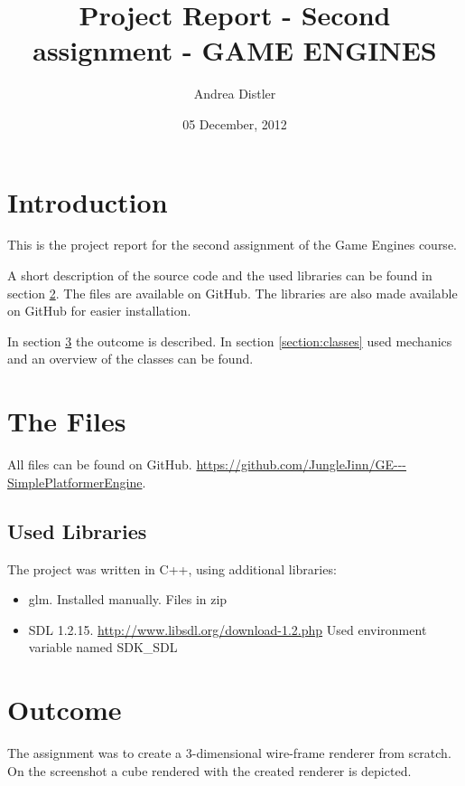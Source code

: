 \documentclass[12pt]{article}
\title{Project Report - Second assignment - GAME ENGINES}
\author{Andrea Distler}
\date{05 December, 2012}
\begin{document}
\maketitle
\newpage

\tableofcontents
\newpage

\section{Introduction}
This is the project report for the second assignment of the Game Engines course.

A short description of the source code and the used libraries can be found in section \ref{section:files}. The files are available on GitHub. The libraries are also made available on GitHub for easier installation.

In section \ref{section:outcome} the outcome is described. In section \ref{section:classes} used mechanics and an overview of the classes can be found.

\section{The Files}
\label{section:files}
All files can be found on GitHub. \newline 
\url{https://github.com/JungleJinn/GE---SimplePlatformerEngine}.

\subsection{Used Libraries}

The project was written in C++, using additional libraries:

\begin{itemize}
		\item{glm. Installed manually. Files in zip}
		\item{SDL 1.2.15. \url{http://www.libsdl.org/download-1.2.php} Used environment variable named SDK\_SDL}
\end{itemize}

\section{Outcome}
\label{section:outcome}

The assignment was to create a 3-dimensional wire-frame renderer from scratch. On the screenshot a cube rendered with the created renderer is depicted.
\end{document}

